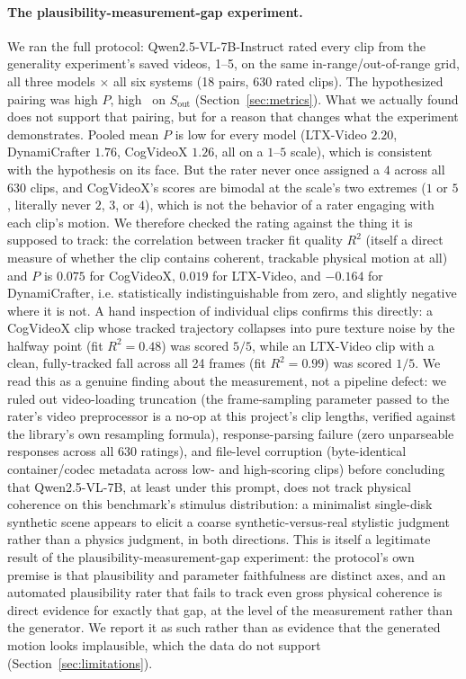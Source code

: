 \documentclass[10pt,twocolumn,letterpaper]{article}
\begin{document}
\paragraph{The plausibility-measurement-gap experiment.}
We ran the full protocol: Qwen2.5-VL-7B-Instruct \citep{qwen25vl} rated
every clip from the generality experiment's saved videos, 1--5, on the same in-range/out-of-range
grid, all three models $\times$ all six systems (18 pairs, 630 rated clips).
The hypothesized pairing was high $P$, high \PRE\ on $S_\text{out}$
(Section~\ref{sec:metrics}). What we actually found does not support that
pairing, but for a reason that changes what the experiment demonstrates.
Pooled mean $P$ is low for every model (LTX-Video $2.20$, DynamiCrafter
$1.76$, CogVideoX $1.26$, all on a $1$--$5$ scale), which is consistent with
the hypothesis on its face. But the rater never once assigned a $4$ across
all $630$ clips, and CogVideoX's scores are bimodal at the scale's two
extremes ($1$ or $5$, literally never $2$, $3$, or $4$), which is not the
behavior of a rater engaging with each clip's motion. We therefore checked
the rating against the thing it is supposed to track: the correlation
between tracker fit quality $R^2$ (itself a direct measure of whether the
clip contains coherent, trackable physical motion at all) and $P$ is
$0.075$ for CogVideoX, $0.019$ for LTX-Video, and $-0.164$ for
DynamiCrafter, i.e. statistically indistinguishable from zero, and slightly
negative where it is not. A hand inspection of individual clips confirms
this directly: a CogVideoX clip whose tracked trajectory collapses into
pure texture noise by the halfway point (fit $R^2=0.48$) was scored $5/5$,
while an LTX-Video clip with a clean, fully-tracked fall
across all 24 frames (fit $R^2=0.99$) was scored $1/5$. We read this as a
genuine finding about the measurement, not a pipeline defect: we ruled out
video-loading truncation (the frame-sampling parameter passed to the
rater's video preprocessor is a no-op at this project's clip lengths, verified
against the library's own resampling formula), response-parsing failure
(zero unparseable responses across all 630 ratings), and file-level
corruption (byte-identical container/codec metadata across low- and
high-scoring clips) before concluding that Qwen2.5-VL-7B, at least under
this prompt, does not track physical coherence on this benchmark's stimulus
distribution: a minimalist single-disk synthetic scene appears to elicit
a coarse synthetic-versus-real stylistic judgment rather than a physics
judgment, in both directions. This is itself a legitimate result of the plausibility-measurement-gap experiment: the
protocol's own premise is that plausibility and parameter faithfulness are
distinct axes, and an automated plausibility rater that fails to track even
gross physical coherence is direct evidence for exactly that gap, at the
level of the measurement rather than the generator. We report it as such
rather than as evidence that the generated motion looks implausible, which
the data do not support (Section~\ref{sec:limitations}).
\end{document}
